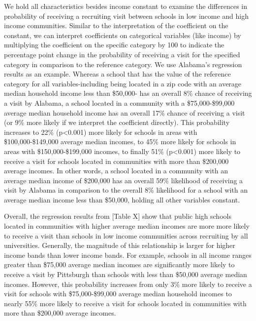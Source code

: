 \documentclass[twoside]{article}
\begin{document}
We hold all characteristics besides income constant to examine the differences in probability of receiving a recruiting visit between schools in low income and high income communities. Similar to the interpretation of the coefficient on the constant, we can interpret coefficients on categorical variables (like income) by multiplying the coefficient on the specific category by 100 to indicate the percentage point change in the probability of receiving a visit for the specified category in comparison to the reference category. We use Alabama's regression results as an example. Whereas a school that has the value of the reference category for all variables-including being located in a zip code with an average median household income less than \$50,000- has an overall 8\% chance of receiving a visit by Alabama, a school located in a community with a \$75,000-\$99,000 average median household income has an overall 17\% chance of receiving a visit (or 9\% more likely if we interpret the coefficient directly).  This probability increases to 22\%  (p<0.001) more likely for schools in areas with \$100,000-\$149,000 average median incomes, to 45\% more likely for schools in areas with \$150,000-\$199,000 incomes, to finally 51\% (p<0.001) more likely to receive a visit for schools located in communities with more than \$200,000 average incomes. In other words, a school located in a community with an average median income of \$200,000 has an overall 59\% likelihood of receiving a visit by Alabama in comparison to the overall 8\% likelihood for a school with an average median income less than \$50,000, holding all other variables constant.

Overall, the regression results from [Table X] show that public high schools located in communities with higher average median incomes are more more likely to receive a visit than schools in low income communities across recruiting by all universities. Generally, the magnitude of this relationship is larger for higher income bands than lower income bands. For example, schools in all income ranges greater than \$75,000 average median incomes are significantly more likely to receive a visit by Pittsburgh than schools with less than \$50,000 average median incomes. However, this probability increases from only 3\% more likely to receive a visit for schools with \$75,000-\$99,000 average median household incomes to nearly 55\% more likely to receive a visit for schools located in communities with more than \$200,000 average incomes. 
\end{document}
